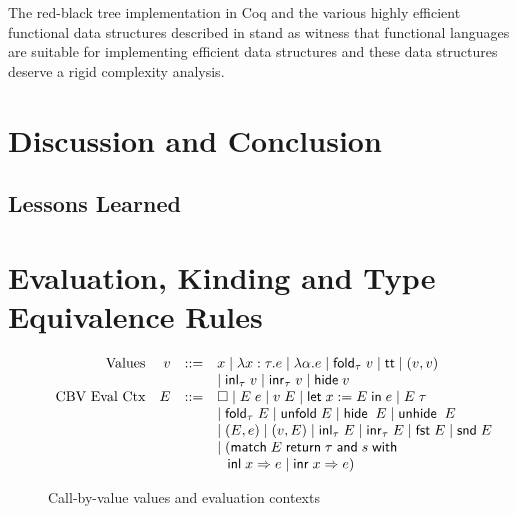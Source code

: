 \documentclass[preprint]{sigplanconf}
\newcommand{\symlet}{\mathsf{let\;}}
\newcommand{\symin}{\mathsf{\;in\;}}
\newcommand{\symand}{\mathsf{\;and\;}}
\newcommand{\symmatch}{\mathsf{match}}
\newcommand{\symwith}{\mathsf{\;with\;}}
\newcommand{\symreturn}{\mathsf{\;return\;}}
\newcommand{\syminl}{\mathsf{inl}}
\newcommand{\syminr}{\mathsf{inr}}
\newcommand{\symfold}{\mathsf{fold}}
\newcommand{\symunfold}{\mathsf{unfold}}
\newcommand{\symhide}{\mathsf{hide}}
\newcommand{\symunhide}{\mathsf{unhide}}
\newcommand{\symtt}{\mathsf{tt}}
\newcommand{\symfst}{\mathsf{fst}}
\newcommand{\symsnd}{\mathsf{snd}}
\begin{document}
The red-black tree implementation \cite{appel2011} in Coq and the various highly efficient functional data structures described in \cite{okasaki} stand as witness that functional languages are suitable for implementing efficient data structures and these data structures deserve a rigid complexity analysis.

\section{\label{section-discussion}Discussion and Conclusion}

\subsection{Lessons Learned}

\appendix

\section{\label{append1}Evaluation, Kinding and Type Equivalence Rules}

\begin{figure}
$$\begin{array}{rrcl}
  \textrm{Values} & v &::=& x \mid \lambda x:\tau.e \mid \lambda \alpha.e \mid \symfold_\tau\;v \mid \symtt \mid (v,v) \\
  & & & \mid \syminl_\tau\;v \mid \syminr_\tau\;v \mid \symhide\; v \\
  \textrm{CBV Eval Ctx} & E &::=& \Box \mid E\;e \mid v\;E \mid \symlet x := E\symin e \mid E\;\tau \\
  & & & \mid \symfold_\tau\;E \mid \symunfold\;E \mid \symhide\;\;E \mid \symunhide\;\;E \\
  & & & \mid (E, e) \mid (v, E) \mid \syminl_\tau\;E \mid \syminr_\tau\;E \mid \symfst\;E \mid \symsnd\;E \\
  & & & \mid (\symmatch\;E\symreturn \tau \symand s \symwith \\
  & & & \hspace{.1in} \syminl\;x\Rightarrow e\;|\;\syminr\;x\Rightarrow e)
\end{array}$$
\caption{\label{eval-aux}Call-by-value values and evaluation contexts}
\end{figure}
\end{document}
